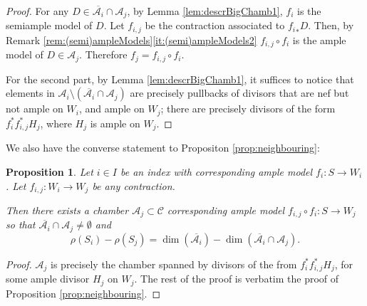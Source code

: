 \documentclass[a4paper,11pt]{amsart}
\newtheorem{proposition}[theorem]{Proposition}
\def\dim{\operatorname{dim}}
\newcommand{\Cc}{\mathcal{C}}
\newcommand{\Aa}{\mathcal{A}}
\begin{document}
\begin{proof}
	For any $D \in \overline{\Aa_i} \cap \Aa_j$, by Lemma \ref{lem:descrBigChamb1}, $f_i$ is the semiample model of $D$.
	Let $f_{i,j}$ be the contraction associated to ${f_i}_*D$.
	Then, by Remark \ref{rem:(semi)ampleModels}\eqref{it:(semi)ampleModels2} $f_{i,j} \circ f_i$ is the ample model of $D \in \Aa_j$.
	Therefore $f_j = f_{i,j} \circ f_i$.
	
	For the second part, by Lemma \ref{lem:descrBigChamb1}, it suffices to notice that elements in $\Aa_i \setminus \left(\overline{\Aa_i} \cap \Aa_j\right)$ are precisely pullbacks of divisors that are nef but not ample on $W_i$, and ample on $W_j$;
	there are precisely divisors of the form $f_i^*f_{i,j}^*H_j$, where $H_j$ is ample on $W_j$.
\end{proof}

We also have the converse statement to Propositon \ref{prop:neighbouring}:

\begin{proposition}\label{prop:neighbouringRev}
	Let $i \in I$ be an index with corresponding ample model $f_i\colon S \to W_i$.
	Let $f_{i,j}\colon W_i \to W_j$ be any contraction. 
	
	Then there exists a chamber $\Aa_j \subset \Cc$ corresponding ample model $f_{i,j} \circ f_i\colon S \to W_j$ so that
	$\overline{\Aa_i} \cap \Aa_j \neq \emptyset$ and 
	\[
	\rho(S_i) - \rho(S_j) = \dim\left(\overline{\Aa_i}\right)  - \dim\left( \overline{\Aa_i} \cap \Aa_j \right).
	\]
\end{proposition}

\begin{proof}
	$\Aa_j$ is precisely the chamber spanned by divisors of the from $f_i^*f_{i,j}^*H_j$, for some ample divisor $H_j$ on $W_j$.
	The rest of the proof is verbatim the proof of Proposition \ref{prop:neighbouring}.
\end{proof}
\end{document}
